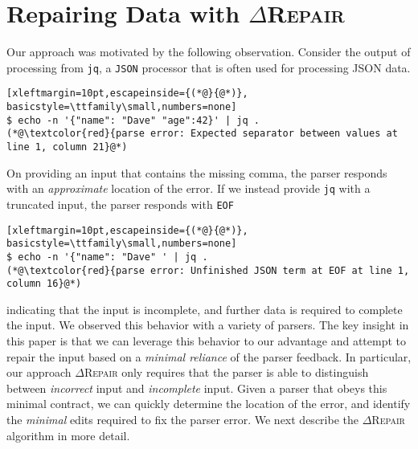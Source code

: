 \documentclass[acmsmall,screen,review,anonymous]{acmart}
\newcommand{\approach}{\textsc{$\Delta$Repair}\xspace}
\newcommand{\drepair}{\approach}
\def\<#1>{\texttt{#1}}
\begin{document}
\section{Repairing Data with \drepair}
\label{sec:drepair}
Our approach was motivated by the following observation.
Consider the output of processing
from \<jq>, a \<JSON> processor that is often used for processing JSON data.
\begin{lstlisting}[xleftmargin=10pt,escapeinside={(*@}{@*)}, basicstyle=\ttfamily\small,numbers=none]
$ echo -n '{"name": "Dave" "age":42}' | jq .
(*@\textcolor{red}{parse error: Expected separator between values at line 1, column 21}@*)
\end{lstlisting}
On providing an input that contains the missing comma, the parser responds with an
\emph{approximate} location of the error.
If we instead provide \<jq> with a truncated input,
the parser responds with \<EOF> 
\begin{lstlisting}[xleftmargin=10pt,escapeinside={(*@}{@*)}, basicstyle=\ttfamily\small,numbers=none]
$ echo -n '{"name": "Dave" ' | jq .
(*@\textcolor{red}{parse error: Unfinished JSON term at EOF at line 1, column 16}@*)
\end{lstlisting}
indicating that the
input is incomplete,
and further data is required to complete the input. We observed this behavior with a variety of
parsers.
The key insight in this paper is that we can leverage this behavior to our advantage and
attempt to repair the input based on a \emph{minimal reliance} of the parser feedback.
In particular, our approach \drepair only requires that the parser is able to distinguish
between \emph{incorrect} input and \emph{incomplete} input. Given a parser that obeys this
minimal contract, we can quickly determine the location of the error, and identify the
\emph{minimal} edits required to fix the parser error.
We next describe the \drepair algorithm in more detail.
\end{document}
